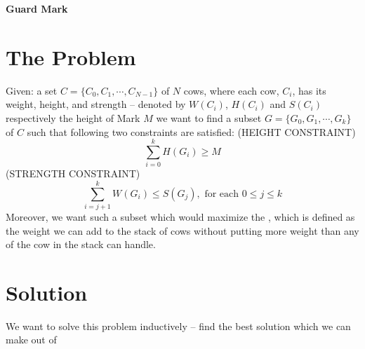 \documentclass{note}
\begin{document}
\small


\begin{center}
{\large\bf Guard Mark}
\end{center}

\section{The Problem}
Given:
\bit
\w a set $C = \{C_0, C_1, \cdots, C_{N-1}\}$ of $N$ cows, where each
    cow, $C_i$, has its 
    weight, height, and strength -- denoted by $W(C_i)$, $H(C_i)$ and $S(C_i)$
respectively
\w the height of Mark $M$
\eit
we want to find a subset $G = \{G_0, G_1, \cdots, G_k\}$ of $C$ such that
following two constraints are satisfied:
\ben
\w (HEIGHT CONSTRAINT) 
    \[\sum_{i=0}^{k} H(G_i) \ge M\]
\w (STRENGTH CONSTRAINT) 
   \[\sum_{i=j+1}^{k} W(G_i) \le S(G_j), \mbox{\ for each\ } 0 \le j \le k\]
\een
Moreover, we want such a subset which would maximize the ,
which is defined as the weight we can add to the stack of cows without putting
more weight than any of the cow in the stack can handle.


\section{Solution}
We want to solve this problem inductively -- find the best solution which we
can make out of 
\end{document}
